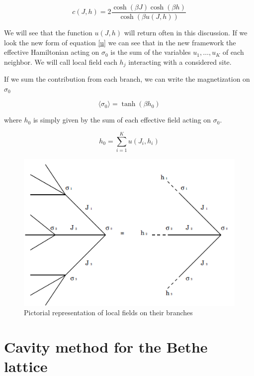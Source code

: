 \begin{equation}
c(J,h) = 2 \frac{\cosh(\beta J)\cosh(\beta h)}{\cosh(\beta u(J,h))}
\end{equation}

We will see that the function $u(J,h)$ will return often in this discussion.
If we look the new form of equation \ref{u} we can see that in the new framework the effective Hamiltonian acting on $\sigma_0$ is the sum of the variables $u_1,\dots,u_K$ of each neighbor. We will call local field each $h_j$ interacting with a considered site.

If we sum the contribution from each branch, we can write
the magnetization on $\sigma_0$

\begin{equation}
\langle\sigma_0\rangle = \tanh(\beta h_0)
\label{sigma0}
\end{equation}

where $h_0$ is simply given by the sum of each effective field acting on $\sigma_0$.

\begin{equation}
h_0 = \sum_{i=1}^K u(J_i,h_i)
\label{merge}
\end{equation}

\begin{figure}
	\centering
		\includegraphics{img/tree.png}
	\caption{Pictorial representation of local fields on their branches}
	\label{fig:tree}
\end{figure}



\section{Cavity method for the Bethe lattice}

